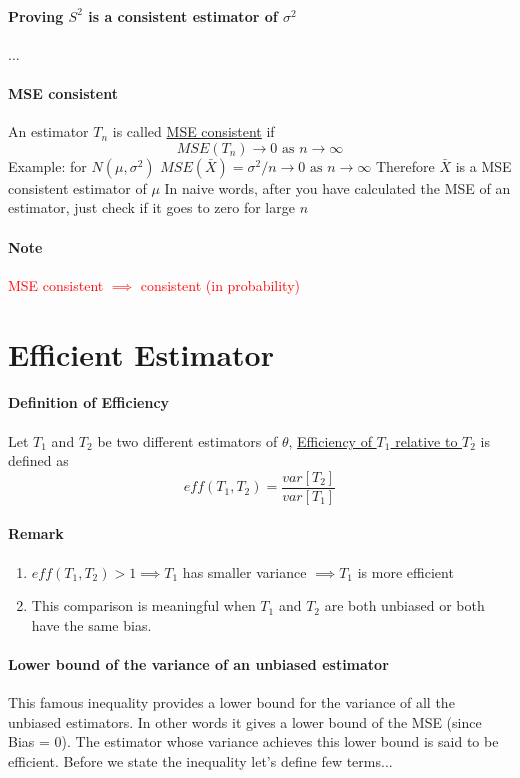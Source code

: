 \documentclass[11pt]{article}
\newcommand{\under}[1]{\underline{#1}}
\begin{document}
 \paragraph{Proving $S^2$ is a consistent estimator of $\sigma^2$}
 $\hdots$
 \paragraph{MSE consistent}
 An estimator $T_n$ is called \under{MSE consistent} if
 $$MSE(T_n) \rightarrow 0 \mbox{ as } n \rightarrow \infty$$
 Example: for $N(\mu,\sigma^2)$
 $MSE(\bar X) = \sigma^2 / n \rightarrow 0 \mbox{ as } n \rightarrow \infty$
 Therefore $\bar X$ is a MSE consistent estimator of $\mu$ \newline
 In naive words, after you have calculated the MSE of an estimator, just check if it goes to zero for large $n$
 \paragraph{Note}
 \textcolor{red}{MSE consistent $\implies$ consistent (in probability)}
 \section{Efficient Estimator}
 \paragraph{Definition of Efficiency}
 Let $T_1$ and $T_2$ be two different estimators of $\theta$, \under{Efficiency of $T_1$ relative to $T_2$} is defined as 
 $$eff(T_1,T_2) = \frac{var[T_2]}{var[T_1]}$$
 \paragraph{Remark}
 \begin{enumerate}
 	\item $eff(T_1, T_2) > 1 \implies T_1$ has smaller variance $\implies T_1$ is more efficient
 	\item This comparison is meaningful when $T_1$ and $T_2$ are both unbiased or both have the same bias.  
 \end{enumerate}
 \paragraph{Lower bound of the variance of an unbiased estimator}
 This famous inequality provides a lower bound for the variance of all the unbiased estimators. In other words it gives a lower bound of the MSE (since Bias = 0). The estimator whose variance achieves this lower bound is said to be efficient. Before we state the inequality let's define few terms...
\end{document}
